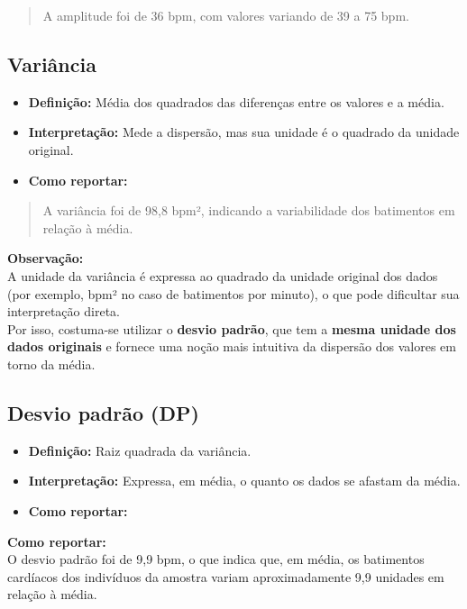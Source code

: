 \documentclass[
]{book}
\providecommand{\tightlist}{%
  \setlength{\itemsep}{0pt}\setlength{\parskip}{0pt}}
\begin{document}
\begin{quote}
A amplitude foi de 36 bpm, com valores variando de 39 a 75 bpm.
\end{quote}

\subsection{Variância}\label{variuxe2ncia}

\begin{itemize}
\tightlist
\item
  \textbf{Definição:} Média dos quadrados das diferenças entre os valores e a média.\\
\item
  \textbf{Interpretação:} Mede a dispersão, mas sua unidade é o quadrado da unidade original.\\
\item
  \textbf{Como reportar:}
\end{itemize}

\begin{quote}
A variância foi de 98,8 bpm², indicando a variabilidade dos batimentos em relação à média.
\end{quote}

\textbf{Observação:}\\
A unidade da variância é expressa ao quadrado da unidade original dos dados (por exemplo, bpm² no caso de batimentos por minuto), o que pode dificultar sua interpretação direta.\\
Por isso, costuma-se utilizar o \textbf{desvio padrão}, que tem a \textbf{mesma unidade dos dados originais} e fornece uma noção mais intuitiva da dispersão dos valores em torno da média.

\subsection{Desvio padrão (DP)}\label{desvio-padruxe3o-dp}

\begin{itemize}
\tightlist
\item
  \textbf{Definição:} Raiz quadrada da variância.\\
\item
  \textbf{Interpretação:} Expressa, em média, o quanto os dados se afastam da média.\\
\item
  \textbf{Como reportar:}
\end{itemize}

\textbf{Como reportar:}\\
O desvio padrão foi de 9,9 bpm, o que indica que, em média, os batimentos cardíacos dos indivíduos da amostra variam aproximadamente 9,9 unidades em relação à média.
\end{document}
